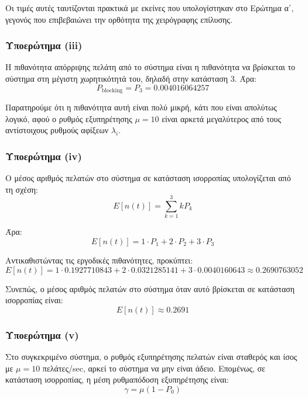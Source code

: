 \documentclass{article}
\begin{document}
Οι τιμές αυτές ταυτίζονται πρακτικά με εκείνες που υπολογίστηκαν στο
Ερώτημα α΄, γεγονός που επιβεβαιώνει την ορθότητα της χειρόγραφης επίλυσης.

\subsubsection{Υποερώτημα (iii)}

Η πιθανότητα απόρριψης πελάτη από το σύστημα είναι η πιθανότητα να βρίσκεται
το σύστημα στη μέγιστη χωρητικότητά του, δηλαδή στην κατάσταση \(3\). Άρα:
\begin{equation}
P_{\text{blocking}} = P_3 = 0.004016064257
\end{equation}

Παρατηρούμε ότι η πιθανότητα αυτή είναι πολύ μικρή, κάτι που είναι απολύτως
λογικό, αφού ο ρυθμός εξυπηρέτησης \(\mu=10\) είναι αρκετά μεγαλύτερος από
τους αντίστοιχους ρυθμούς αφίξεων \(\lambda_i\).

\subsubsection{Υποερώτημα (iv)}

Ο μέσος αριθμός πελατών στο σύστημα σε κατάσταση ισορροπίας υπολογίζεται από
τη σχέση:
\begin{equation}
E[n(t)] = \sum_{k=1}^{3} kP_k
\end{equation}

Άρα:
\begin{equation}
E[n(t)] = 1\cdot P_1 + 2\cdot P_2 + 3\cdot P_3
\end{equation}

Αντικαθιστώντας τις εργοδικές πιθανότητες, προκύπτει:
\begin{equation}
E[n(t)] =
1\cdot 0.1927710843
+ 2\cdot 0.0321285141
+ 3\cdot 0.0040160643
\approx 0.2690763052
\end{equation}

Συνεπώς, ο μέσος αριθμός πελατών στο σύστημα όταν αυτό βρίσκεται σε
κατάσταση ισορροπίας είναι:
\begin{equation}
E[n(t)] \approx 0.2691
\end{equation}

\subsubsection{Υποερώτημα (v)}

Στο συγκεκριμένο σύστημα, ο ρυθμός εξυπηρέτησης πελατών είναι σταθερός και
ίσος με \(\mu=10\) πελάτες/sec, αρκεί το σύστημα να μην είναι άδειο. Επομένως,
σε κατάσταση ισορροπίας, η μέση ρυθμαπόδοση εξυπηρέτησης είναι:
\begin{equation}
\gamma = \mu(1-P_0)
\end{equation}
\end{document}

